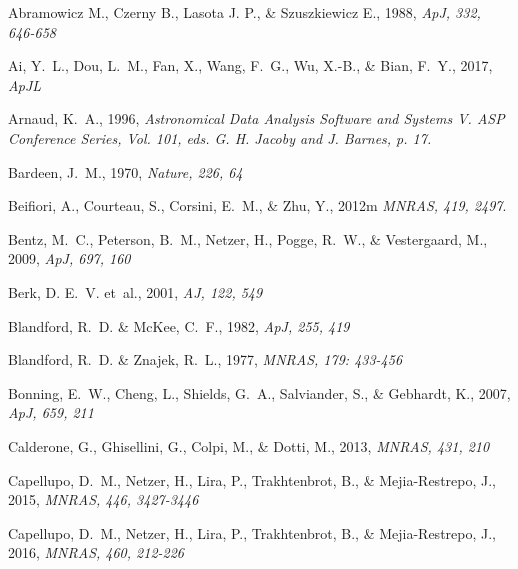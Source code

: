 \documentclass{aa}
\begin{document}
\begin{thebibliography}{}

Abramowicz M., Czerny B., Lasota J. P., \& Szuszkiewicz E., 1988,
\newblock \emph{ApJ, 332, 646-658}

Ai, Y.~L., Dou, L.~M., Fan, X., Wang, F.~G., Wu, X.-B., \& Bian, F.~Y., 2017,
\newblock \emph{ApJL}

Arnaud, K.~A., 1996,
\newblock \emph{Astronomical Data Analysis Software and Systems V. ASP
  Conference Series, Vol. 101, eds. G. H. Jacoby and J. Barnes, p. 17.}

Bardeen, J.~M., 1970,
\newblock \emph{Nature, 226, 64}

Beifiori, A., Courteau, S., Corsini, E.~M., \& Zhu, Y., 2012m
\newblock \emph{MNRAS, 419, 2497}.

Bentz, M.~C., Peterson, B.~M., Netzer, H., Pogge, R.~W., \& Vestergaard, M., 2009,
\newblock \emph{ApJ, 697, 160}

Berk, D. E.~V. et~al., 2001,
\newblock \emph{AJ, 122, 549}

Blandford, R.~D. \& McKee, C.~F., 1982,
\newblock \emph{ApJ, 255, 419}

Blandford, R.~D. \& Znajek, R.~L., 1977,
\newblock \emph{MNRAS, 179: 433-456}

Bonning, E.~W., Cheng, L., Shields, G.~A., Salviander, S., \& Gebhardt, K., 2007,
\newblock \emph{ApJ, 659, 211}

Calderone, G., Ghisellini, G., Colpi, M., \& Dotti, M., 2013,
\newblock \emph{MNRAS, 431, 210}

Capellupo, D.~M., Netzer, H., Lira, P., Trakhtenbrot, B., \& Mejia-Restrepo, J., 2015,
\newblock \emph{MNRAS, 446, 3427-3446}

Capellupo, D.~M., Netzer, H., Lira, P., Trakhtenbrot, B., \& Mejia-Restrepo, J., 2016,
\newblock \emph{MNRAS, 460, 212-226}


\end{thebibliography}
\end{document}

